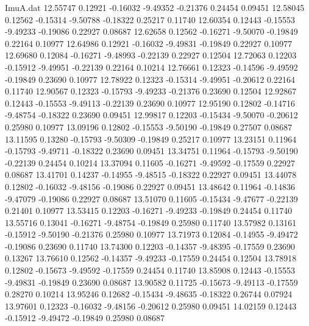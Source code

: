 \begin{filecontents}{ImuA.dat}
  12.55747    0.12921   -0.16032   -9.49352   -0.21376    0.24454    0.09451
  12.58045    0.12562   -0.15314   -9.50788   -0.18322    0.25217    0.11740
  12.60354    0.12443   -0.15553   -9.49233   -0.19086    0.22927    0.08687
  12.62658    0.12562   -0.16271   -9.50070   -0.19849    0.22164    0.10977
  12.64986    0.12921   -0.16032   -9.49831   -0.19849    0.22927    0.10977
  12.69680    0.12084   -0.16271   -9.48993   -0.22139    0.22927    0.12504
  12.72063    0.12203   -0.15912   -9.49951   -0.22139    0.22164    0.10214
  12.76661    0.12323   -0.14596   -9.49592   -0.19849    0.23690    0.10977
  12.78922    0.12323   -0.15314   -9.49951   -0.20612    0.22164    0.11740
  12.90567    0.12323   -0.15793   -9.49233   -0.21376    0.23690    0.12504
  12.92867    0.12443   -0.15553   -9.49113   -0.22139    0.23690    0.10977
  12.95190    0.12802   -0.14716   -9.48754   -0.18322    0.23690    0.09451
  12.99817    0.12203   -0.15434   -9.50070   -0.20612    0.25980    0.10977
  13.09196    0.12802   -0.15553   -9.50190   -0.19849    0.27507    0.08687
  13.11595    0.13280   -0.15793   -9.50309   -0.19849    0.25217    0.10977
  13.23151    0.11964   -0.15793   -9.49711   -0.18322    0.23690    0.09451
  13.34751    0.11964   -0.15793   -9.50190   -0.22139    0.24454    0.10214
  13.37094    0.11605   -0.16271   -9.49592   -0.17559    0.22927    0.08687
  13.41701    0.14237   -0.14955   -9.48515   -0.18322    0.22927    0.09451
  13.44078    0.12802   -0.16032   -9.48156   -0.19086    0.22927    0.09451
  13.48642    0.11964   -0.14836   -9.47079   -0.19086    0.22927    0.08687
  13.51070    0.11605   -0.15434   -9.47677   -0.22139    0.21401    0.10977
  13.53415    0.12203   -0.16271   -9.49233   -0.19849    0.24454    0.11740
  13.55716    0.13041   -0.16271   -9.48754   -0.19849    0.25980    0.11740
  13.57982    0.13161   -0.15912   -9.50190   -0.21376    0.25980    0.10977
  13.71973    0.12084   -0.14955   -9.49472   -0.19086    0.23690    0.11740
  13.74300    0.12203   -0.14357   -9.48395   -0.17559    0.23690    0.13267
  13.76610    0.12562   -0.14357   -9.49233   -0.17559    0.24454    0.12504
  13.78918    0.12802   -0.15673   -9.49592   -0.17559    0.24454    0.11740
  13.85908    0.12443   -0.15553   -9.49831   -0.19849    0.23690    0.08687
  13.90582    0.11725   -0.15673   -9.49113   -0.17559    0.28270    0.10214
  13.95246    0.12682   -0.15434   -9.48635   -0.18322    0.26744    0.07924
  13.97601    0.12323   -0.16032   -9.48156   -0.20612    0.25980    0.09451
  14.02159    0.12443   -0.15912   -9.49472   -0.19849    0.25980    0.08687

\end{filecontents}
